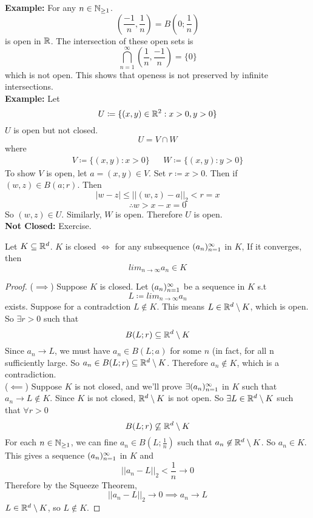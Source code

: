 \documentclass[openany]{report}
\begin{document}
\textbf{Example:} For any $n \in \mathbb{N}_{\geq 1}$.
$$\left(\frac{-1}{n},\frac{1}{n}\right) = B(0;\frac{1}{n})$$ is open in $\mathbb{R}$. The intersection of these open sets is 
$$\bigcap^\infty_{n = 1} \left(\frac{1}{n},\frac{-1}{n}\right) = \{0\} $$ which is not open. This shows that openess is not preserved by infinite intersections. \\[2ex]
\textbf{Example:} Let $$U \coloneqq \{(x,y) \in \mathbb{R}^2 : x > 0 , y >0\}$$
$U$ is open but not closed.\\[1ex]
$$U = V \cap W$$
where 
\begin{align*}
    V \coloneqq \{(x,y) : x > 0\} &&
    W \coloneqq \{(x,y): y >0\}
\end{align*}
To show $V$ is open, let $a = (x,y) \in V$. Set $r \coloneqq x > 0$. Then if $(w,z) \in B(a;r)$. Then 
$$|w-z| \leq ||(w,z)-a||_2 < r = x$$
$$\therefore w > x -x = 0$$
So $(w,z) \in U$. Similarly, $W$ is open. Therefore $U$ is open.\\[2ex]
\textbf{Not Closed:} Exercise.
\begin{prop}
    Let $K \subseteq \mathbb{R}^d$. $K$ is closed $\iff$ for any subsequence $({a}_n)_{n=1}^\infty$ in $K$, If it converges, then
    $$lim_{n \rightarrow \infty} a_n \in K$$
\end{prop}
\begin{proof}
    ($\implies$) Suppose $K$ is closed. Let $({a}_n)_{n=1}^\infty$ be a sequence in $K$ s.t 
    $$L \coloneq lim_{n \rightarrow \infty} a_n$$
    exists. Suppose for a contradction $L \not\in K$. This means $L \in \mathbb{R}^d \setminus K$, which is open. So $\exists r > 0$ such that 
    $$B(L;r) \subseteq \mathbb{R}^d \setminus K$$
    Since $a_n \rightarrow L$, we must have $a_n \in B(L ; a)$ for some $n$ (in fact, for all n sufficiently large. So $a_n \in B(L;r) \subseteq \mathbb{R}^d \setminus K$. Therefore $a_n \not\in K$, which is a contradiction. \\[1ex]
    ($\impliedby$) Suppose $K$ is not closed, and we'll prove $\exists ({a}_n)_{n=1}^\infty$ in $K$ such that $a_n \rightarrow L \not\in K$. Since $K$ is not closed, $\mathbb{R}^d \setminus K$ is not open. So $\exists L \in \mathbb{R}^d \setminus K$ such that $\forall r > 0$
    $$B(L;r) \not\subseteq \mathbb{R}^d \setminus K$$
    For each $n \in \mathbb{N}_{\geq1}$, we can fine $a_n \in B(L; \frac{1}{n})$ such that $a_n \not\in \mathbb{R}^d \setminus K$. So $a_n \in K$. This gives a sequence $({a}_n)_{n=1}^\infty$ in $K$ and 
    $$||a_n - L||_2 < \frac{1}{n} \rightarrow 0$$
    Therefore by the Squeeze Theorem,
    $$||a_n - L||_2 \rightarrow 0 \implies a_n \rightarrow L$$
    $L \in \mathbb{R}^d \setminus K$, so $L \not\in K$.
\end{proof}
\end{document}
